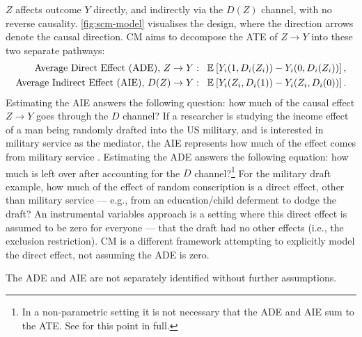 $Z$ affects outcome $Y$ directly, and indirectly via the $D(Z)$ channel, with no reverse causality.
\autoref{fig:scm-model} visualises the design, where the direction arrows denote the causal direction.
CM aims to decompose the ATE of $Z \to Y$ into these two separate pathways:
\begin{align*}
    \text{Average Direct Effect (ADE), } Z \to Y: \;\;\;&
        \mathbb{E}_{} \left[ Y_i(1, D_i(Z_i)) - Y_i(0, D_i(Z_i)) \right], \\
    \text{Average Indirect Effect (AIE), } D(Z) \to Y: \;\;\;&
            \mathbb{E}_{} \left[ Y_i(Z_i, D_i(1)) - Y_i(Z_i, D_i(0)) \right].
\end{align*}
Estimating the AIE answers the following question: how much of the causal effect $Z \to Y$ goes through the $D$ channel?
If a researcher is studying the income effect of a man being randomly drafted into the US military, and is interested in military service as the mediator, the AIE represents how much of the effect comes from military service \citep{angrist1990lifetime}.
Estimating the ADE answers the following equation: how much is left over after accounting for the $D$ channel?\footnote{
    In a non-parametric setting it is not necessary that the ADE and AIE sum to the ATE.
    See \cite{imai2010identification} for this point in full.
}
For the military draft example, how much of the effect of random conscription is a direct effect, other than military service --- e.g., from an education/child deferment to dodge the draft?
An instrumental variables approach is a setting where this direct effect is assumed to be zero for everyone --- that the draft had no other effects (i.e., the exclusion restriction).
CM is a different framework attempting to explicitly model the direct effect, not assuming the ADE is zero.

The ADE and AIE are not separately identified without further assumptions.

